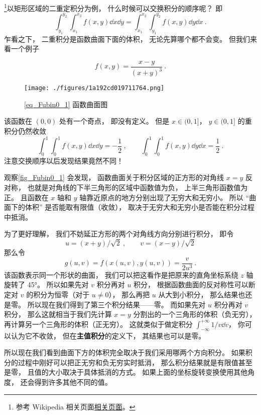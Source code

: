 

\footnote{参考 Wikipedia 相关页面\href{https://en.wikipedia.org/wiki/Fubini's_theorem}{相关页面}。}以矩形区域的二重定积分为例， 什么时候可以交换积分的顺序呢？ 即
\begin{equation}
\int_{y_1}^{y_2}\int_{x_1}^{x_2} f(x, y) \dd{x} \dd{y} = \int_{x_1}^{x_2}\int_{y_1}^{y_2} f(x, y) \dd{y}\dd{x}~.
\end{equation}
乍看之下， 二重积分是函数曲面下面的体积， 无论先算哪个都不会变。 但我们来看一个例子

\begin{example}{}\label{ex_Fubin0_1}
\begin{equation}\label{eq_Fubin0_1}
f(x, y) = \frac{x - y}{(x+y)^3}~.
\end{equation}
\begin{figure}[ht]
\centering
\texttt{[image: ./figures/1a192cd019711764.png]}
\caption{\autoref{eq_Fubin0_1} 函数曲面图} \label{fig_Fubin0_1}
\end{figure}
该函数在 $(0,0)$ 处有一个奇点， 即没有定义。 但是 $x \in (0, 1]$， $y \in (0, 1]$ 的重积分仍然收敛
\begin{equation}
\int_0^1 \int_0^1 f(x,y) \dd{x} \dd{y} = -\frac{1}{2}~,
\qquad
\int_0^1 \int_0^1 f(x,y) \dd{y} \dd{x} = \frac{1}{2}~.
\end{equation}
注意交换顺序以后发现结果竟然不同！

观察\autoref{fig_Fubin0_1} 会发现， 函数曲面关于积分区域的正方形的对角线 $x=y$ 反对称， 也就是对角线的下半三角形的区域中函数值为负， 上半三角形函数值为正。 且函数在 $x$ 轴和 $y$ 轴靠近原点的地方分别出现了无穷大和无穷小。 所以 “曲面下的体积” 是否能取有限值（收敛）， 取决于无穷大和无穷小是否能在积分过程中抵消。

为了更好理解， 我们不妨延正方形的两个对角线方向分别进行积分， 即令
\begin{equation}
u = (x+y)/\sqrt{2}~, \qquad
v=(x-y)/\sqrt{2}
\end{equation}
那么令
\begin{equation}
g(u,v) = f(x(u,v), y(u,v)) = \frac{v}{2u^3}~.
\end{equation}
该函数表示同一个形状的曲面， 我们可以把这看作是把原来的直角坐标系绕 $z$ 轴旋转了 45°。 所以如果先对 $v$ 积分再对 $u$ 积分， 根据函数曲面的反对称性可以断定对 $v$ 的积分为恒零（对于 $u\ne 0$）， 那么再把 $u$ 从大到小积分， 那么结果也还是零。 所以现在我们得到了第三个积分结果——零。 而如果先对 $u$ 积分再对 $v$ 积分， 那么这就相当于我们先计算 $x=y$ 分割出的一个三角形的体积（负无穷）， 再计算另一个三角形的体积（正无穷）。 这就类似于做定积分 $\int_{-\infty}^{+\infty}1/v\dd{v}$， 你可以认为它不收敛， 但在\textbf{主值积分}的定义下， 其结果也可以是零。%

所以现在我们看到曲面下方的体积完全取决于我们采用哪两个方向积分。 如果积分的过程中刚好可以把正无穷和负无穷实时抵消， 那么积分结果就是有限值甚至是零， 且值的大小取决于具体抵消的方式。 如果上面的坐标旋转变换使用其他角度， 还会得到许多其他不同的值。
\end{example}

